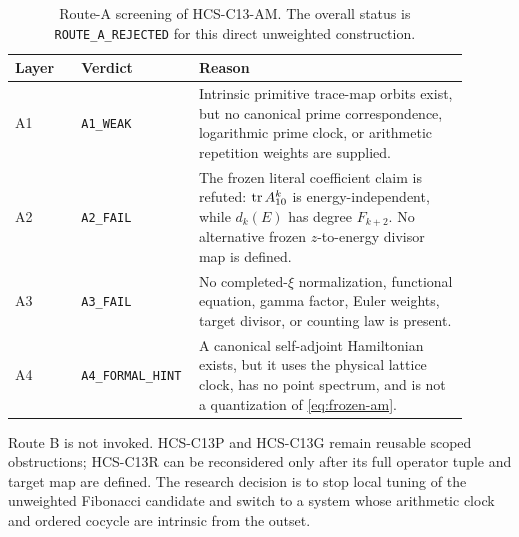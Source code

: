 \begin{table}[ht]
\centering
\begin{tabular}{>{\raggedright\arraybackslash}p{0.14\linewidth}
                >{\raggedright\arraybackslash}p{0.18\linewidth}
                >{\raggedright\arraybackslash}p{0.58\linewidth}}
\toprule
Layer & Verdict & Reason \\
\midrule
A1 & \texttt{A1\_WEAK} & Intrinsic primitive trace-map orbits exist, but no
canonical prime correspondence, logarithmic prime clock, or arithmetic
repetition weights are supplied. \\
A2 & \texttt{A2\_FAIL} & The frozen literal coefficient claim is refuted:
\(\operatorname{tr} A_{10}^k\) is energy-independent, while \(d_k(E)\) has degree
\(F_{k+2}\).  No alternative frozen \(z\)-to-energy divisor map is defined. \\
A3 & \texttt{A3\_FAIL} & No completed-\(\xi\) normalization, functional
equation, gamma factor, Euler weights, target divisor, or counting law is
present. \\
A4 & \texttt{A4\_FORMAL\_HINT} & A canonical self-adjoint Hamiltonian exists,
but it uses the physical lattice clock, has no point spectrum, and is not a
quantization of \eqref{eq:frozen-am}. \\
\bottomrule
\end{tabular}
\caption{Route-A screening of HCS-C13-AM.  The overall status is
\texttt{ROUTE\_A\_REJECTED} for this direct unweighted construction.}
\label{tab:route-a}
\end{table}

Route B is not invoked.  HCS-C13P and HCS-C13G remain reusable scoped
obstructions; HCS-C13R can be reconsidered only after its full operator tuple
and target map are defined.  The research decision is to stop local tuning of
the unweighted Fibonacci candidate and switch to a system whose arithmetic
clock and ordered cocycle are intrinsic from the outset.
